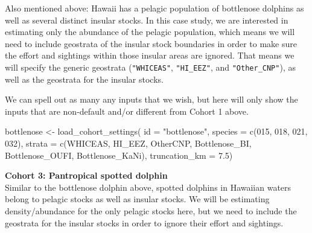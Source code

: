 \documentclass[
]{book}
\newenvironment{Shaded}{\begin{snugshade}}{\end{snugshade}}
\newcommand{\AttributeTok}[1]{\textcolor[rgb]{0.77,0.63,0.00}{#1}}
\newcommand{\FloatTok}[1]{\textcolor[rgb]{0.00,0.00,0.81}{#1}}
\newcommand{\FunctionTok}[1]{\textcolor[rgb]{0.00,0.00,0.00}{#1}}
\newcommand{\NormalTok}[1]{#1}
\newcommand{\OtherTok}[1]{\textcolor[rgb]{0.56,0.35,0.01}{#1}}
\newcommand{\StringTok}[1]{\textcolor[rgb]{0.31,0.60,0.02}{#1}}
\begin{document}
Also mentioned above: Hawaii has a pelagic population of bottlenose dolphins as well as several distinct insular stocks. In this case study, we are interested in estimating only the abundance of the pelagic population, which means we will need to include geostrata of the insular stock boundaries in order to make sure the effort and sightings within those insular areas are ignored. That means we will specify the generic geostrata (\texttt{"WHICEAS"}, \texttt{"HI\_EEZ"}, and \texttt{"Other\_CNP"}), as well as the geostrata for the insular stocks.

We can spell out as many any inputs that we wish, but here will only show the inputs that are non-default and/or different from Cohort 1 above.

\begin{Shaded}
\begin{Highlighting}[]
\NormalTok{bottlenose }\OtherTok{\textless{}{-}} \FunctionTok{load\_cohort\_settings}\NormalTok{(}
  \AttributeTok{id =} \StringTok{"bottlenose"}\NormalTok{,}
  \AttributeTok{species =} \FunctionTok{c}\NormalTok{(}\StringTok{\textquotesingle{}015\textquotesingle{}}\NormalTok{, }\StringTok{\textquotesingle{}018\textquotesingle{}}\NormalTok{, }\StringTok{\textquotesingle{}021\textquotesingle{}}\NormalTok{, }\StringTok{\textquotesingle{}032\textquotesingle{}}\NormalTok{),}
  \AttributeTok{strata =} \FunctionTok{c}\NormalTok{(}\StringTok{\textquotesingle{}WHICEAS\textquotesingle{}}\NormalTok{, }\StringTok{\textquotesingle{}HI\_EEZ\textquotesingle{}}\NormalTok{, }\StringTok{\textquotesingle{}OtherCNP\textquotesingle{}}\NormalTok{,}
             \StringTok{\textquotesingle{}Bottlenose\_BI\textquotesingle{}}\NormalTok{, }\StringTok{\textquotesingle{}Bottlenose\_OUFI\textquotesingle{}}\NormalTok{, }\StringTok{\textquotesingle{}Bottlenose\_KaNi\textquotesingle{}}\NormalTok{),}
  \AttributeTok{truncation\_km =} \FloatTok{7.5}\NormalTok{)}
\end{Highlighting}
\end{Shaded}

\textbf{Cohort 3: Pantropical spotted dolphin}\\
Similar to the bottlenose dolphin above, spotted dolphins in Hawaiian waters belong to pelagic stocks as well as insular stocks. We will be estimating density/abundance for the only pelagic stocks here, but we need to include the geostrata for the insular stocks in order to ignore their effort and sightings.
\end{document}
